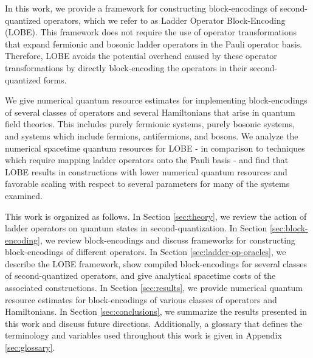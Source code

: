In this work, we provide a framework for constructing block-encodings of second-quantized operators, which we refer to as Ladder Operator Block-Encoding (LOBE).
This framework does not require the use of operator transformations that expand fermionic \cite{jordan1928paulische, bravyi2002fermionic, seeley2012bravyi} and bosonic \cite{somma2005quantum,standard-binary} ladder operators in the Pauli operator basis.
Therefore, LOBE avoids the potential overhead caused by these operator transformations by directly block-encoding the operators in their second-quantized forms.

We give numerical quantum resource estimates for implementing block-encodings of several classes of operators and several Hamiltonians that arise in quantum field theories.
This includes purely fermionic systems, purely bosonic systems, and systems which include fermions, antifermions, and bosons. 
We analyze the numerical spacetime quantum resources for LOBE - in comparison to techniques which require mapping ladder operators onto the Pauli basis - and find that LOBE results in constructions with lower numerical quantum resources and favorable scaling with respect to several parameters for many of the systems examined.

This work is organized as follows.
In Section \ref{sec:theory}, we review the action of ladder operators on quantum states in second-quantization.
In Section \ref{sec:block-encoding}, we review block-encodings and discuss frameworks for constructing block-encodings of different operators.
In Section \ref{sec:ladder-op-oracles}, we describe the LOBE framework, show compiled block-encodings for several classes of second-quantized operators, and give analytical spacetime costs of the associated constructions.
In Section \ref{sec:results}, we provide numerical quantum resource estimates for block-encodings of various classes of operators and Hamiltonians.
In Section \ref{sec:conclusions}, we summarize the results presented in this work and discuss future directions.
Additionally, a glossary that defines the terminology and variables used throughout this work is given in Appendix \ref{sec:glossary}.
